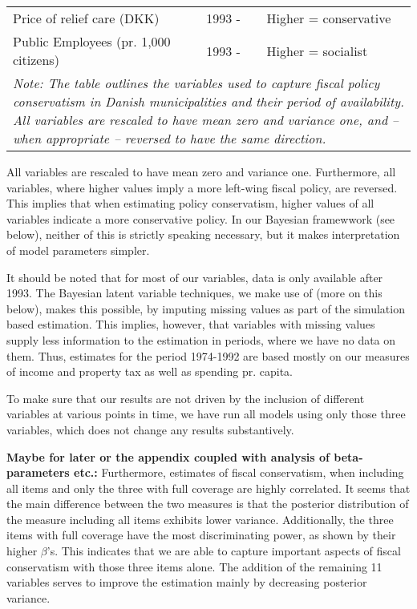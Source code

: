 \documentclass[12pt,a4]{article}
\begin{document}
\begin{table}[h]
\begin{tabular}{lll}
		Price of relief care (DKK)				 & 1993 -	  &	   Higher = conservative	 \\
		Public Employees (pr. 1,000 citizens)	 & 1993 -  	  &	   Higher = socialist	     \\
		\hline
		\multicolumn{3}{p{14 cm}}{\emph{Note: The table outlines the variables used to capture fiscal policy conservatism in Danish municipalities and their period of availability. All variables are rescaled to have mean zero and variance one, and -- when appropriate -- reversed to have the same direction.}}
	\end{tabular}
\end{table} 

All variables are rescaled to have mean zero and variance one. Furthermore, all variables, where higher values imply a more left-wing fiscal policy, are reversed. This implies that when estimating policy conservatism, higher values of all variables indicate a more conservative policy. In our Bayesian framewwork (see below), neither of this is strictly speaking necessary, but it makes interpretation of model parameters simpler.

It should be noted that for most of our variables, data is only available after 1993. The Bayesian latent variable techniques, we make use of (more on this below), makes this possible, by imputing missing values as part of the simulation based estimation. This implies, however, that variables with missing values supply less information to the estimation in periods, where we have no data on them. Thus, estimates for the period 1974-1992 are based mostly on our measures of income and property tax as well as spending pr. capita. 

To make sure that our results are not driven by the inclusion of different variables at various points in time, we have run all models using only those three variables, which does not change any results substantively. 

\textbf{Maybe for later or the appendix coupled with analysis of beta-parameters etc.:} Furthermore, estimates of fiscal conservatism, when including all items and only the three with full coverage are highly correlated. It seems that the main difference between the two measures is that the posterior distribution of the measure including all items exhibits lower variance. Additionally, the three items with full coverage have the most discriminating power, as shown by their higher $\beta$'s. This indicates that we are able to capture important aspects of fiscal conservatism with those three items alone. The addition of the remaining 11 variables serves to improve the estimation mainly by decreasing posterior variance.
\end{document}
